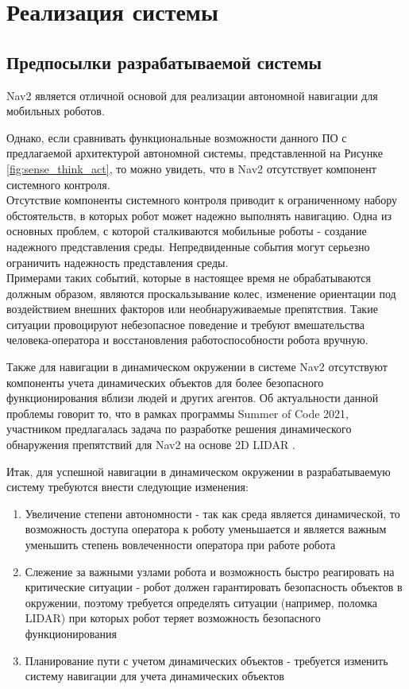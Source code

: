 \chapter{Реализация системы}
\label{ch:chap3}

\section{Предпосылки разрабатываемой системы}
Nav2 является отличной основой для реализации автономной навигации для мобильных роботов. 

Однако, если сравнивать функциональные возможности данного ПО с предлагаемой архитектурой автономной системы, представленной на Рисунке \ref*{fig:sense_think_act}, то можно увидеть, что в Nav2 отсутствует компонент системного контроля. \\
Отсутствие компоненты системного контроля приводит к ограниченному набору обстоятельств, в которых робот может надежно выполнять навигацию. Одна из основных проблем, с которой сталкиваются мобильные роботы - создание надежного представления среды. Непредвиденные события могут серьезно ограничить надежность представления среды. \\
Примерами таких событий, которые в настоящее время не обрабатываются должным образом, являются проскальзывание колес, изменение ориентации под воздействием внешних факторов или необнаруживаемые препятствия. Такие ситуации провоцируют небезопасное поведение и требуют вмешательства человека-оператора и восстановления работоспособности робота вручную.

Также для навигации в динамическом окружении в системе Nav2 отсутствуют компоненты учета динамических объектов для более безопасного функционирования вблизи людей и других агентов. Об актуальности данной проблемы говорит то, что в рамках программы Summer of Code 2021, участником предлагалась задача по разработке решения динамического обнаружения препятствий для Nav2 на основе 2D LIDAR \cite{nav2-challenge}.  

Итак, для успешной навигации в динамическом окружении в разрабатываемую систему требуются внести следующие изменения:
\begin{enumerate}
    \item Увеличение степени автономности - так как среда является динамической, то возможность доступа оператора к роботу уменьшается и является важным уменьшить степень вовлеченности оператора при работе робота
    \item Слежение за важными узлами робота и возможность быстро реагировать на критические ситуации - робот должен гарантировать безопасность объектов в окружении, поэтому требуется определять ситуации (например, поломка LIDAR) при которых робот теряет возможность безопасного функционирования
    \item Планирование пути с учетом динамических объектов - требуется изменить систему навигации для учета динамических объектов
\end{enumerate}

